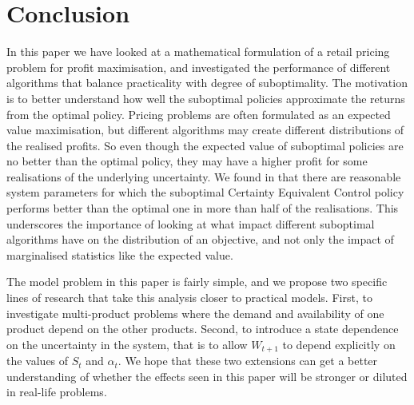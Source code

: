 \documentclass[main.tex]{subfiles}
\begin{document}
\listoftodos

\section{Conclusion}\label{sec:conclusion}
In this paper we have looked at a mathematical formulation of a
retail pricing problem for profit maximisation, and investigated the
performance of different algorithms that balance practicality
with degree of suboptimality. The motivation is to better understand
how well the suboptimal policies approximate the returns from the
optimal policy.
Pricing problems are often formulated as an expected value
maximisation, but different algorithms may create different
distributions of the realised profits.
So even though the expected value of suboptimal policies are no better
than the optimal policy, they may have a higher profit for some
realisations of the underlying uncertainty.
We found in  that there are
reasonable system parameters for which
the suboptimal Certainty Equivalent Control policy performs better
than the optimal one in more
than half of the realisations.
This underscores the importance of looking at what impact
different suboptimal algorithms have on the distribution of
an objective, and not only the impact of
marginalised statistics like the expected value.

The model problem in this paper is fairly simple, and
we propose two specific lines of research that
take this analysis closer to practical models.
First, to investigate multi-product problems where the demand and
availability of one product depend on the other products.
Second, to introduce a state dependence on the uncertainty in the
system, that is to allow $W_{t+1}$ to depend explicitly on the values
of $S_t$ and $\alpha_t$.
We hope that these two extensions can get a better understanding of
whether the effects seen in this paper will be stronger or diluted
in real-life problems.

\biblio
\end{document}

